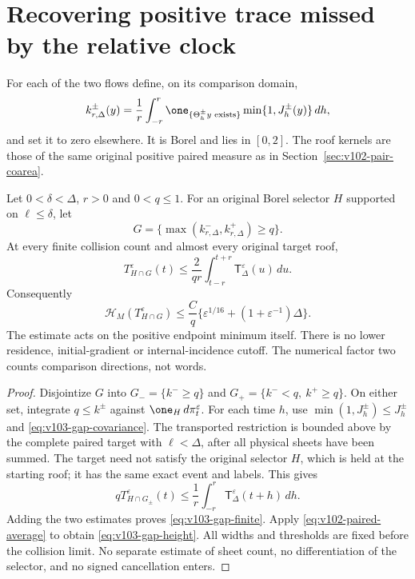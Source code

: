 \section{Recovering positive trace missed by the relative clock}
\label{sec:v103-recovery}
For each of the two flows define, on its comparison domain,
\begin{equation}\label{eq:v103-gap-clock}
 k_{r,\Delta}^\pm(y)=\frac1r\int_{-r}^r
 \one_{\{\Theta_h^\pm y\text{ exists}\}}
                            \min\{1,J_h^\pm(y)\}\,dh,
\end{equation}
and set it to zero elsewhere. It is Borel and lies in $[0,2]$.
The roof kernels are those of the same original positive paired
measure as in Section~\ref{sec:v102-pair-coarea}.

\begin{theorem}
\label{thm:v103-gap-height}
Let $0<\delta<\Delta$, $r>0$ and $0<q\le1$. For an original
Borel selector $H$ supported on $\ell\le\delta$, let
\[
 G=\{\max(k_{r,\Delta}^-,k_{r,\Delta}^+)\ge q\}.
\]
At every finite collision count and almost every original target roof,
\begin{equation}\label{eq:v103-gap-finite}
 T_{H\cap G}^\varepsilon(t)
 \le\frac{2}{qr}\int_{t-r}^{t+r}
                         \mathsf T_\Delta^\varepsilon(u)\,du.
\end{equation}
Consequently
\begin{equation}\label{eq:v103-gap-height}
 \mathcal H_M(T_{H\cap G}^\varepsilon)
 \le\frac Cq\{\varepsilon^{1/16}+
                                    (1+\varepsilon^{-1})\Delta\}.
\end{equation}
The estimate acts on the positive endpoint minimum itself. There is
no lower residence, initial-gradient or internal-incidence cutoff.
The numerical factor two counts comparison directions, not words.
\end{theorem}
\begin{proof}
Disjointize $G$ into $G_- =\{k^-\ge q\}$ and
$G_+=\{k^-<q,\ k^+\ge q\}$. On either set, integrate $q\le k^\pm$
against $\one_H\,d\pi_t^\varepsilon$. For each time $h$, use
$\min(1,J_h^\pm)\le J_h^\pm$ and
\eqref{eq:v103-gap-covariance}. The transported restriction is
bounded above by the complete paired target with $\ell<\Delta$,
after all physical sheets have been summed. The target need not
satisfy the original selector $H$, which is held at the starting
roof; it has the same exact event and labels. This gives
\[
 qT_{H\cap G_\pm}^\varepsilon(t)
 \le\frac1r\int_{-r}^r\mathsf T_\Delta^\varepsilon(t+h)\,dh.
\]
Adding the two estimates proves \eqref{eq:v103-gap-finite}.
Apply \eqref{eq:v102-paired-average} to obtain
\eqref{eq:v103-gap-height}. All widths and thresholds are fixed
before the collision limit. No separate estimate of sheet count,
no differentiation of the selector, and no signed cancellation enters.
\end{proof}

